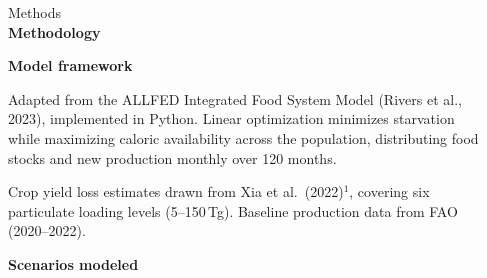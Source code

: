 \documentclass[final]{beamer}
\newlength{\sepwidth}
\newlength{\colwidth}
\newlength{\widecolwidth}
\newenvironment{labelblock}[2]{%
  \begin{block}{%
      {\small\color{structure.fg!70!bg}#1}%
      \\[2pt]                                  %
      {\large\bfseries#2}%
      }%
      }{%
  \end{block}%
  }
\newcommand{\separatorcolumn}{\begin{column}{\sepwidth}\end{column}}
\begin{document}
\begin{frame}[t]
\begin{columns}[t]
    \separatorcolumn
  \end{columns}

  \vspace{0.5cm}

  \begin{columns}[t]
    \separatorcolumn

    \begin{column}{\widecolwidth}
      \begin{labelblock}{Methods}{Methodology}
        \begin{minipage}[t]{0.48\linewidth}
          \raggedright
          \vspace{0pt} %
          {\small\bfseries Model framework}

          \small
          Adapted from the ALLFED Integrated Food System Model (Rivers et al., 2023),
          implemented in Python. Linear optimization minimizes starvation while
          maximizing caloric availability across the population, distributing food
          stocks and new production monthly over 120 months.

          \vspace{3pt}
          Crop yield loss estimates drawn from Xia et al.\ (2022)$^{1}$, covering six
          particulate loading levels (5--150\,Tg). Baseline production data from
          FAO (2020--2022).
        \end{minipage}\hfill
        \begin{minipage}[t]{0.48\linewidth}
          \raggedright
          {\small\bfseries Scenarios modeled}


\end{minipage}
\end{labelblock}
\end{column}
\end{columns}
\end{frame}
\end{document}
